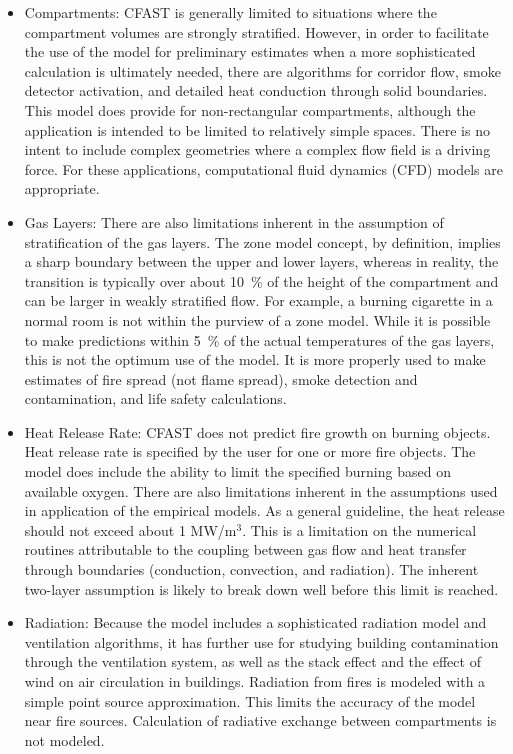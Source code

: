 \begin{itemize}
\item Compartments:  CFAST is generally limited to situations where the compartment volumes are strongly stratified.  However, in order to facilitate the use of the model for preliminary estimates when a more sophisticated calculation is ultimately needed, there are algorithms for corridor flow, smoke detector activation, and detailed heat conduction through solid boundaries.  This model does provide for non-rectangular compartments, although the application is intended to be limited to relatively simple spaces.  There is no intent to include complex geometries where a complex flow field is a driving force.  For these applications, computational fluid dynamics (CFD) models are appropriate.

\item Gas Layers:  There are also limitations inherent in the assumption of stratification of the gas layers.  The zone model concept, by definition, implies a sharp boundary between the upper and lower layers, whereas in reality, the transition is typically over about 10~\% of the height of the compartment and can be larger in weakly stratified flow.  For example, a burning cigarette in a normal room is not within the purview of a zone model.  While it is possible to make predictions within 5~\% of the actual temperatures of the gas layers, this is not the optimum use of the model.  It is more properly used to make estimates of fire spread (not flame spread), smoke detection and contamination, and life safety calculations.

\item Heat Release Rate:  CFAST does not predict fire growth on burning objects. Heat release rate is specified by the user for one or more fire objects. The model does include the ability to limit the specified burning based on available oxygen. There are also limitations inherent in the assumptions used in application of the empirical models.  As a general guideline, the heat release should not exceed about 1 MW/m$^3$.  This is a limitation on the numerical routines attributable to the coupling between gas flow and heat transfer through boundaries (conduction, convection, and radiation).  The inherent two-layer assumption is likely to break down well before this limit is reached.

\item Radiation:  Because the model includes a sophisticated radiation model and ventilation algorithms, it has further use for studying building contamination through the ventilation system, as well as the stack effect and the effect of wind on air circulation in buildings.  Radiation from fires is modeled with a simple point source approximation.  This limits the accuracy of the model near fire sources. Calculation of radiative exchange between compartments is not modeled.


\end{itemize}
